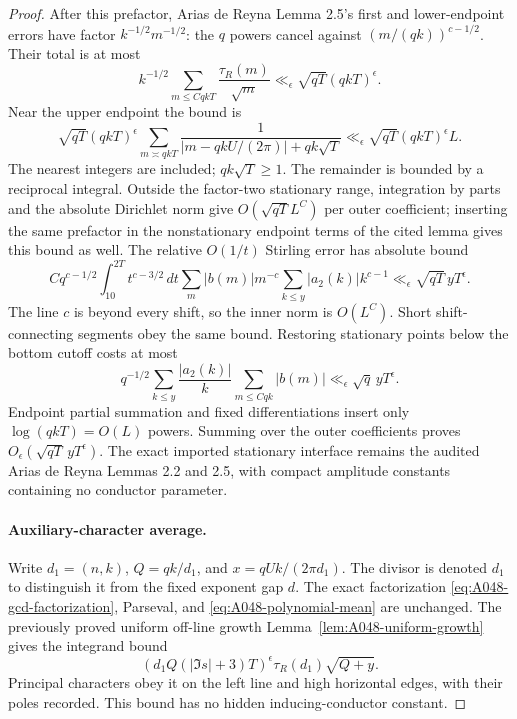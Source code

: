 \begin{proof}
After this prefactor, Arias de Reyna Lemma 2.5's first
and lower-endpoint errors have factor $k^{-1/2}m^{-1/2}$:
the $q$ powers cancel against $(m/(qk))^{c-1/2}$.
Their total is at most
\[
 k^{-1/2}\sum_{m\le CqkT}\frac{\tau_R(m)}{\sqrt m}
                 \ll_\epsilon\sqrt{qT}(qkT)^\epsilon .
\tag{A049u.10}
\]
Near the upper endpoint the bound is
\[
 \sqrt{qT}(qkT)^\epsilon
 \sum_{m\asymp qkT}
 \frac1{|m-qkU/(2\pi)|+qk\sqrt T}
           \ll_\epsilon\sqrt{qT}(qkT)^\epsilon L .
\tag{A049u.11}
\]
The nearest integers are included; $qk\sqrt T\ge1$.
The remainder is bounded by a reciprocal integral.
Outside the factor-two stationary range, integration by
parts and the absolute Dirichlet norm give
$O(\sqrt{qT}L^C)$ per outer coefficient; inserting the
same prefactor in the nonstationary endpoint terms
of the cited lemma gives this bound as well.
The relative $O(1/t)$ Stirling error has absolute bound
\[
 Cq^{c-1/2}\int_{10}^{2T}t^{c-3/2}\,dt
 \sum_m|b(m)|m^{-c}
 \sum_{k\le y}|a_2(k)|k^{c-1}
       \ll_\epsilon\sqrt{qT}\,yT^\epsilon.
\]
The line $c$ is beyond every shift, so the inner norm
is $O(L^C)$. Short shift-connecting segments obey the
same bound. Restoring stationary points below the
bottom cutoff costs at most
\[
 q^{-1/2}\sum_{k\le y}\frac{|a_2(k)|}{k}
               \sum_{m\le Cqk}|b(m)|
                    \ll_\epsilon\sqrt q\,yT^\epsilon .
\]
Endpoint partial summation and fixed differentiations
insert only $\log(qkT)=O(L)$ powers. Summing over the
outer coefficients proves
$O_\epsilon(\sqrt{qT}\,yT^\epsilon)$.
The exact imported stationary interface remains the
audited Arias de Reyna Lemmas 2.2 and 2.5, with compact
amplitude constants containing no conductor parameter.

\paragraph{Auxiliary-character average.}
Write $d_1=(n,k)$, $Q=qk/d_1$, and
$x=qUk/(2\pi d_1)$. The divisor is denoted $d_1$ to
distinguish it from the fixed exponent gap $d$.
The exact factorization \eqref{eq:A048-gcd-factorization},
Parseval, and \eqref{eq:A048-polynomial-mean} are unchanged.
The previously proved uniform off-line growth
Lemma~\ref{lem:A048-uniform-growth} gives the integrand bound
\[
 (d_1Q(|\Im s|+3)T)^\epsilon
                     \tau_R(d_1)\sqrt{Q+y}.
\tag{A049u.12}
\]
Principal characters obey it on the left line and high
horizontal edges, with their poles recorded. This bound
has no hidden inducing-conductor constant.


\end{proof}
